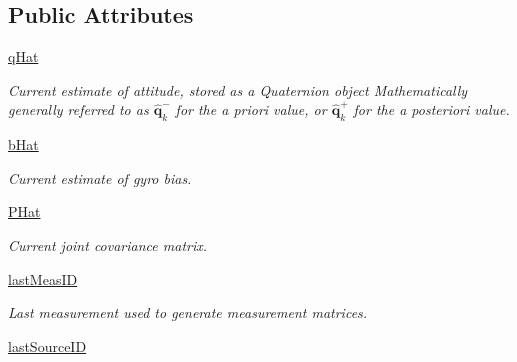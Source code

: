 \subsection*{Public Attributes}
\begin{DoxyCompactItemize}
\item 
\hyperlink{classAttitudeSubstate_1_1AttitudeState6DOF_a36a58a47280151dd544762d9a1d5c35d}{q\+Hat}
\begin{DoxyCompactList}\small\item\em Current estimate of attitude, stored as a Quaternion object Mathematically generally referred to as $\mathbf{\hat{q}}^{-}_{k}$ for the a priori value, or $\mathbf{\hat{q}}^{+}_{k}$ for the a posteriori value. \end{DoxyCompactList}\item 
\hyperlink{classAttitudeSubstate_1_1AttitudeState6DOF_a1b8eff7c89a7a03875dc04263da7ec18}{b\+Hat}\hypertarget{classAttitudeSubstate_1_1AttitudeState6DOF_a1b8eff7c89a7a03875dc04263da7ec18}{}\label{classAttitudeSubstate_1_1AttitudeState6DOF_a1b8eff7c89a7a03875dc04263da7ec18}

\begin{DoxyCompactList}\small\item\em Current estimate of gyro bias. \end{DoxyCompactList}\item 
\hyperlink{classAttitudeSubstate_1_1AttitudeState6DOF_a6aac27efa4d5962865f7d3f701c919ab}{P\+Hat}
\begin{DoxyCompactList}\small\item\em Current joint covariance matrix. \end{DoxyCompactList}\item 
\hyperlink{classAttitudeSubstate_1_1AttitudeState6DOF_a1ea482e5536162f74876d1dd23b12e96}{last\+Meas\+ID}\hypertarget{classAttitudeSubstate_1_1AttitudeState6DOF_a1ea482e5536162f74876d1dd23b12e96}{}\label{classAttitudeSubstate_1_1AttitudeState6DOF_a1ea482e5536162f74876d1dd23b12e96}

\begin{DoxyCompactList}\small\item\em Last measurement used to generate measurement matrices. \end{DoxyCompactList}\item 
\hyperlink{classAttitudeSubstate_1_1AttitudeState6DOF_a0161cc024a651de854100014872165af}{last\+Source\+ID}\hypertarget{classAttitudeSubstate_1_1AttitudeState6DOF_a0161cc024a651de854100014872165af}{}\label{classAttitudeSubstate_1_1AttitudeState6DOF_a0161cc024a651de854100014872165af}


\end{DoxyCompactItemize}
